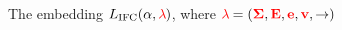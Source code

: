 \documentclass{sigplanconf}
\newcommand{\Varid}[1]{\mathit{#1}}
\newcommand{\Red}[1]{{\color{red} #1}}
\begin{document}
\begin{figure}
\caption{The embedding \ensuremath{L_\text{IFC}(\alpha,\Red{\lambda}\;\!\!)}, where
\ensuremath{\Red{\lambda}\;\!\!\mathrel{=}(\tar{\Sigma},\tar{E},\tar{e},\tar{v},\rightarrow)}}
\label{fig:embedding}
\end{figure}
\end{document}
